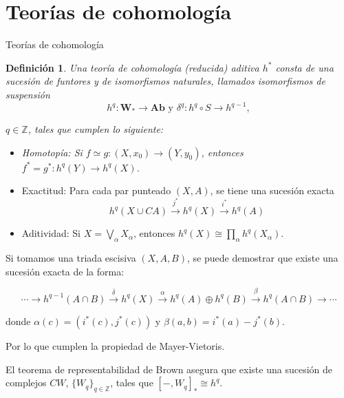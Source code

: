 \documentclass{beamer}
\newtheorem{df}{Definici\'on}
\newcommand{\G}{\mathbf{Ab}}
\newcommand{\Z}{\mathbb{Z}}
\begin{document}
\section{Teorías de cohomología}
\begin{frame}{Teorías de cohomología}
\begin{df}
Una teor\'ia de cohomología (reducida) aditiva $h^{\ast}$ consta de una sucesi\'on de funtores y de isomorfismos naturales, llamados isomorfismos de suspensi\'on
\[h^{q}:\mathbf{W}_\ast\to\G \mbox{ y } \delta^{q}:h^{q}\circ S\to h^{q-1},\]

$q\in\Z$, tales que cumplen lo siguiente:
\begin{itemize}
    \item Homotop\'ia: Si $f\simeq g:(X,x_{0})\to(Y,y_{0})$, entonces $f^{\ast}=g^{\ast}:h^{q}(Y)\to h^{q}(X)$.
\end{itemize}
\end{df}    
\end{frame}

\begin{frame}
\begin{itemize}
\item Exactitud: Para cada par punteado $(X,A)$, se tiene una sucesi\'on exacta
\[h^{q}(X\cup CA)\xrightarrow{j^{\ast}} h^{q}(X)\xrightarrow{i^{\ast}} h^{q}(A)\]
\item Aditividad: Si $X=\bigvee_{\alpha}X_{\alpha}$, entonces $h^{q}(X)\cong\prod_{\alpha} h^{q}(X_{\alpha})$.
\end{itemize}
\end{frame}

\begin{frame}
Si tomamos una triada escisiva $(X,A,B)$, se puede demostrar que existe una sucesi\'on exacta de la forma:

\[\cdots\rightarrow h^{q-1}(A\cap B)\xrightarrow{\overline{\delta}}h^{q}(X)\xrightarrow{\alpha}h^{q}(A)\oplus h^{q}(B)\xrightarrow{\beta}h^{q}(A\cap B)\rightarrow\cdots\]

donde $\alpha(c)=(i^{\ast}(c),j^{\ast}(c))$ y $\beta(a,b)=i^{\ast}(a)-j^{\ast}(b)$.

Por lo que cumplen la propiedad de Mayer-Vietoris.
\end{frame}

\begin{frame}
El teorema de representabilidad de Brown asegura que existe una sucesi\'on de complejos $CW$, $\{W_{q}\}_{q\in\Z}$, tales que $[-,W_{q}]_{\ast}\cong h^{q}$.
\end{frame}
\end{document}
